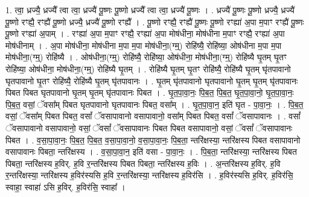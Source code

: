 \documentclass[17pt]{extarticle}
\begin{document}
1. त्वा॒ ध्रज्यै॒ ध्रज्यै᳚ त्वा त्वा॒ ध्रज्यै॑ पू॒ष्णः पू॒ष्णो ध्रज्यै᳚ त्वा त्वा॒ ध्रज्यै॑ पू॒ष्णः । . ध्रज्यै॑ पू॒ष्णः पू॒ष्णो ध्रज्यै॒ ध्रज्यै॑ पू॒ष्णो रꣳह्यै॒ रꣳह्यै॑ पू॒ष्णो ध्रज्यै॒ ध्रज्यै॑ पू॒ष्णो रꣳह्यै᳚ । . पू॒ष्णो रꣳह्यै॒ रꣳह्यै॑ पू॒ष्णः पू॒ष्णो रꣳह्या॑ अ॒पा म॒पाꣳ रꣳह्यै॑ पू॒ष्णः पू॒ष्णो रꣳह्या॑ अ॒पाम् । . रꣳह्या॑ अ॒पा म॒पाꣳ रꣳह्यै॒ रꣳह्या॑ अ॒पा मोष॑धीना॒ मोष॑धीना म॒पाꣳ रꣳह्यै॒ रꣳह्या॑ अ॒पा मोष॑धीनाम् । . अ॒पा मोष॑धीना॒ मोष॑धीना म॒पा म॒पा मोष॑धीना॒(ग्म्॒) रोहि॑ष्यै॒ रोहि॑ष्या॒ ओष॑धीना म॒पा म॒पा मोष॑धीना॒(ग्म्॒) रोहि॑ष्यै । . ओष॑धीना॒(ग्म्॒) रोहि॑ष्यै॒ रोहि॑ष्या॒ ओष॑धीना॒ मोष॑धीना॒(ग्म्॒) रोहि॑ष्यै घृ॒तम् घृ॒तꣳ रोहि॑ष्या॒ ओष॑धीना॒ मोष॑धीना॒(ग्म्॒) रोहि॑ष्यै घृ॒तम् । . रोहि॑ष्यै घृ॒तम् घृ॒तꣳ रोहि॑ष्यै॒ रोहि॑ष्यै घृ॒तम् घृ॑तपावानो घृतपावानो घृ॒तꣳ रोहि॑ष्यै॒ रोहि॑ष्यै घृ॒तम् घृ॑तपावानः । . घृ॒तम् घृ॑तपावानो घृतपावानो घृ॒तम् घृ॒तम् घृ॑तपावानः पिबत पिबत घृतपावानो घृ॒तम् घृ॒तम् घृ॑तपावानः पिबत । . घृ॒त॒पा॒वा॒नः॒ पि॒ब॒त॒ पि॒ब॒त॒ घृ॒त॒पा॒वा॒नो॒ घृ॒त॒पा॒वा॒नः॒ पि॒ब॒त॒ वसां॒ ॅवसा᳚म् पिबत घृतपावानो घृतपावानः पिबत॒ वसा᳚म् । . घृ॒त॒पा॒वा॒न॒ इति॑ घृत - पा॒वा॒नः॒ । . पि॒ब॒त॒ वसां॒ ॅवसा᳚म् पिबत पिबत॒ वसां᳚ ॅवसापावानो वसापावानो॒ वसा᳚म् पिबत पिबत॒ वसां᳚ ॅवसापावानः । . वसां᳚ ॅवसापावानो वसापावानो॒ वसां॒ ॅवसां᳚ ॅवसापावानः पिबत पिबत वसापावानो॒ वसां॒ ॅवसां᳚ ॅवसापावानः पिबत । . व॒सा॒पा॒वा॒नः॒ पि॒ब॒त॒ पि॒ब॒त॒ व॒सा॒पा॒वा॒नो॒ व॒सा॒पा॒वा॒नः॒ पि॒ब॒ता॒ न्तरि॑क्षस्या॒ न्तरि॑क्षस्य पिबत वसापावानो वसापावानः पिबता॒ न्तरि॑क्षस्य । . व॒सा॒पा॒वा॒न॒ इति॑ वसा - पा॒वा॒नः॒ । . पि॒ब॒ता॒ न्तरि॑क्षस्या॒ न्तरि॑क्षस्य पिबत पिबता॒ न्तरि॑क्षस्य ह॒विर्. ह॒वि र॒न्तरि॑क्षस्य पिबत पिबता॒ न्तरि॑क्षस्य ह॒विः । . अ॒न्तरि॑क्षस्य ह॒विर्. ह॒वि र॒न्तरि॑क्षस्या॒ न्तरि॑क्षस्य ह॒विर॑स्यसि ह॒वि र॒न्तरि॑क्षस्या॒ न्तरि॑क्षस्य ह॒विर॑सि । . ह॒विर॑स्यसि ह॒विर्. ह॒विर॑सि॒ स्वाहा॒ स्वाहा॑ ऽसि ह॒विर्. ह॒विर॑सि॒ स्वाहा᳚ । \newline
\end{document}
